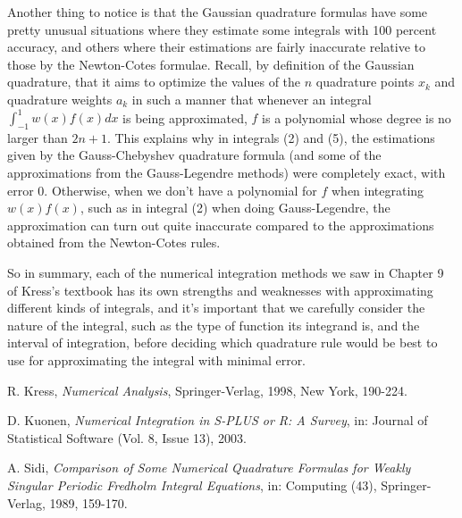 \documentclass[a4paper,draft]{amsproc}
\theoremstyle{plain}
\theoremstyle{definition}
\theoremstyle{remark}
\numberwithin{equation}{section}
\begin{document}
Another thing to notice is that the Gaussian quadrature formulas have some pretty unusual situations where they estimate some integrals with 100 percent accuracy, and others where their estimations are fairly inaccurate relative to those by the Newton-Cotes formulae. Recall, by definition of the Gaussian quadrature, that it aims to optimize the values of the $n$ quadrature points $x_k$ and quadrature weights $a_k$ in such a manner that whenever an integral $\displaystyle\int_{-1}^{1}w(x)f(x)dx$ is being approximated, $f$ is a polynomial whose degree is no larger than $2n+1$. This explains why in integrals (2) and (5), the estimations given by the Gauss-Chebyshev quadrature formula (and some of the approximations from the Gauss-Legendre methods) were completely exact, with error 0. Otherwise, when we don't have a polynomial for $f$ when integrating $w(x)f(x)$, such as in integral (2) when doing Gauss-Legendre, the approximation can turn out quite inaccurate compared to the approximations obtained from the Newton-Cotes rules.

So in summary, each of the numerical integration methods we saw in Chapter 9 of Kress's textbook has its own strengths and weaknesses with approximating different kinds of integrals, and it's important that we carefully consider the nature of the integral, such as the type of function its integrand is, and the interval of integration, before deciding which quadrature rule would be best to use for approximating the integral with minimal error.


\begin{thebibliography}{n} %

 R. Kress, \emph{Numerical Analysis}, Springer-Verlag, 1998, New York, 190-224.

 D. Kuonen, \emph{Numerical Integration in S-PLUS or R: A Survey}, in: Journal of Statistical Software (Vol. 8, Issue 13), 2003.

 A. Sidi, \emph{Comparison of Some Numerical Quadrature Formulas for Weakly Singular Periodic Fredholm Integral Equations}, in: Computing (43), Springer-Verlag, 1989, 159-170.

\end{thebibliography}
\end{document}
